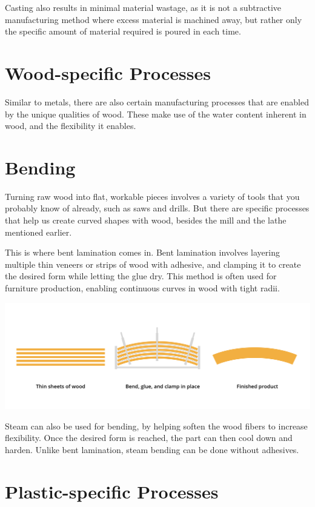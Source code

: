 Casting also results in minimal material wastage, as it is not a subtractive manufacturing method where excess material is machined away, but rather only the specific amount of material required is poured in each time.

\section{Wood-specific Processes}

Similar to metals, there are also certain manufacturing processes that are enabled by the unique qualities of wood. These make use of the water content inherent in wood, and the flexibility it enables.

\section{Bending}

Turning raw wood into flat, workable pieces involves a variety of tools that you probably know of already, such as saws and drills. But there are specific processes that help us create curved shapes with wood, besides the mill and the lathe mentioned earlier.

This is where bent lamination comes in. Bent lamination involves layering multiple thin veneers or strips of wood with adhesive, and clamping it to create the desired form while letting the glue dry. This method is often used for furniture production, enabling continuous curves in wood with tight radii.

\includegraphics[width=.75\textwidth]{woodBend.png}


Steam can also be used for bending, by helping soften the wood fibers to increase flexibility. Once the desired form is reached, the part can then cool down and harden. Unlike bent lamination, steam bending can be done without adhesives.

\section{Plastic-specific Processes}

